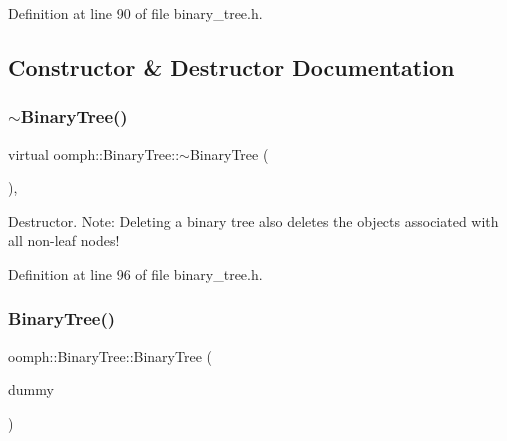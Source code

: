 Definition at line 90 of file binary\+\_\+tree.\+h.



\subsection{Constructor \& Destructor Documentation}
\mbox{\label{classoomph_1_1BinaryTree_a782282825e91454e43d79a847cedecf5}} 
\subsubsection{\texorpdfstring{$\sim$\+Binary\+Tree()}{~BinaryTree()}}
{\footnotesize\ttfamily virtual oomph\+::\+Binary\+Tree\+::$\sim$\+Binary\+Tree (\begin{DoxyParamCaption}{ }\end{DoxyParamCaption})\hspace{0.3cm}{\ttfamily [inline]}, {\ttfamily [virtual]}}



Destructor. Note\+: Deleting a binary tree also deletes the objects associated with all non-\/leaf nodes! 



Definition at line 96 of file binary\+\_\+tree.\+h.

\mbox{\label{classoomph_1_1BinaryTree_aec7ba886e9b9005b52e6162fab35a5b8}} 
\subsubsection{\texorpdfstring{Binary\+Tree()}{BinaryTree()}\hspace{0.1cm}{\footnotesize\ttfamily [1/4]}}
{\footnotesize\ttfamily oomph\+::\+Binary\+Tree\+::\+Binary\+Tree (\begin{DoxyParamCaption}\item[{const \hyperlink{classoomph_1_1BinaryTree}{Binary\+Tree} \&}]{dummy }\end{DoxyParamCaption})\hspace{0.3cm}{\ttfamily [inline]}}



